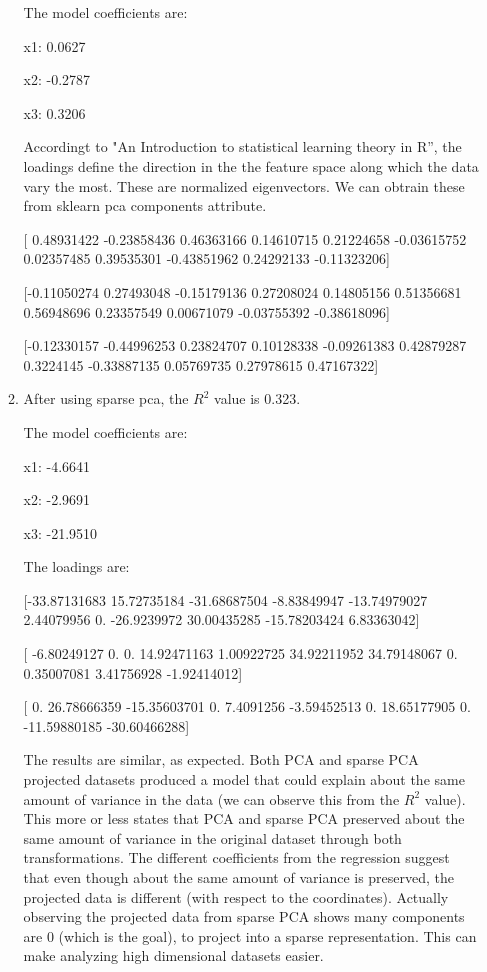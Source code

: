 \documentclass[twoside,10pt]{article}
\theoremstyle{definition}
\theoremstyle{definition}
\theoremstyle{remark}
\renewcommand{\>}{{\rightarrow}}
\newcommand{\1}{{\mathbf 1}}
\newcommand{\0}{{\mathbf 0}}
\begin{document}
\begin{enumerate}
\begin{enumerate}
    The model coefficients are:
    
    x1: 0.0627
    
    x2: -0.2787
    
    x3: 0.3206

    Accordingt to "An Introduction to statistical learning theory in R'', the loadings define the direction in the the feature space along which the data vary the most. These are normalized eigenvectors. We can obtrain these from sklearn pca components attribute.

    [ 0.48931422 -0.23858436  0.46363166  0.14610715  0.21224658 -0.03615752
    0.02357485  0.39535301 -0.43851962  0.24292133 -0.11323206]
    
  [-0.11050274  0.27493048 -0.15179136  0.27208024  0.14805156  0.51356681
  0.56948696  0.23357549  0.00671079 -0.03755392 -0.38618096]
  
 [-0.12330157 -0.44996253  0.23824707  0.10128338 -0.09261383  0.42879287
 0.3224145  -0.33887135  0.05769735  0.27978615  0.47167322]
 

    
  \item
    After using sparse pca, the $R^2$ value is 0.323.

    The model coefficients are:

    x1: -4.6641

    x2: -2.9691

    x3: -21.9510

    The loadings are:

    [-33.87131683  15.72735184 -31.68687504  -8.83849947 -13.74979027
    2.44079956   0.         -26.9239972   30.00435285 -15.78203424
    6.83363042]
    
 [ -6.80249127   0.           0.          14.92471163   1.00922725
   34.92211952  34.79148067   0.           0.35007081   3.41756928
   -1.92414012]
   
 [  0.          26.78666359 -15.35603701   0.           7.4091256
   -3.59452513   0.          18.65177905   0.         -11.59880185
   -30.60466288]
   


    The results are similar, as expected. Both PCA and sparse PCA projected datasets produced a model that could explain about the same amount of variance in the data (we can observe this from the  $R^2$ value). This more or less states that PCA and sparse PCA preserved about the same amount of variance in the original dataset through both transformations.  The different coefficients from the regression suggest that even though about the same amount of variance is preserved, the projected data is different (with respect to the coordinates). Actually observing the projected data from sparse PCA shows many components are 0 (which is the goal), to project into a sparse representation. This can make analyzing high dimensional datasets easier.
    

\end{enumerate}
\end{enumerate}
\end{document}
